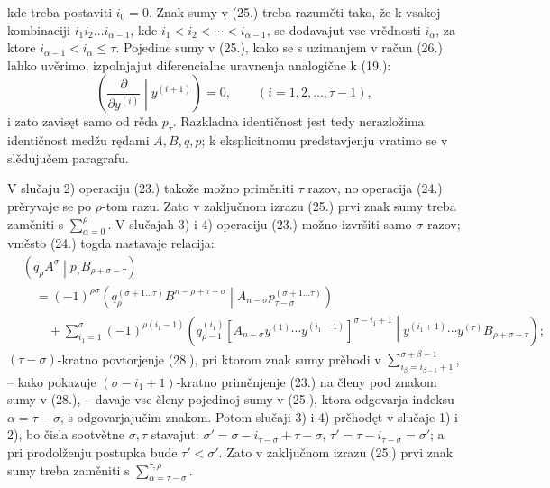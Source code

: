 \documentclass[11pt]{article}
\newcommand{\pair}[2]{\left(#1\middle|#2\right)}
\begin{document}
kde treba postaviti $i_0=0$. Znak sumy v (25.) treba razuměti tako, že k vsakoj kombinaciji $i_1i_2\ldots i_{\alpha-1}$, kde $i_1<i_2<\cdots<i_{\alpha-1}$, se dodavajut vse vrědnosti $i_\alpha$, za ktore $i_{\alpha-1}<i_\alpha\le\tau$. Pojedine sumy v (25.), kako se s uzimanjem v račun (26.) lahko uvěrimo, izpolnjajut diferencialne uravnenja analogične k (19.):
\begin{equation}
 \left(\frac{\partial}{\partial y^{(i)}}\middle|y^{(i+1)}\right)=0,
 \qquad (i=1,2,\ldots,\tau-1),
\tag{27}
\end{equation}
i zato zavisęt samo od rěda $p_\tau$. Razkladna identičnost jest tedy nerazložima identičnost medžu rędami $A,B,q,p$; k eksplicitnomu predstavjenju vratimo se v slědujučem paragrafu.

V slučaju 2) operaciju (23.) takože možno priměniti $\tau$ razov, no operacija (24.) prěryvaje se po $\rho$-tom razu. Zato v zaključnom izrazu (25.) prvi znak sumy treba zaměniti s $\sum_{\alpha=0}^{\rho}$. V slučajah 3) i 4) operaciju (23.) možno izvršiti samo $\sigma$ razov; vměsto (24.) togda nastavaje relacija:
\begin{equation}
\begin{aligned}
&\pair{q_\rho A^\sigma}{p_\tau B_{\rho+\sigma-\tau}}\\
&\quad=(-1)^{\rho\sigma}
\pair{q_\rho^{(\sigma+1\ldots\tau)}B^{n-\rho+\tau-\sigma}}
{A_{n-\sigma}p_{\tau-\sigma}^{(\sigma+1\ldots\tau)}}\\
&\qquad+\sum_{i_1=1}^{\sigma}(-1)^{\rho(i_1-1)}
\pair{q_{\rho-1}^{(i_1)}
[A_{n-\sigma}y^{(1)}\cdots y^{(i_1-1)}]^{\sigma-i_1+1}}
{y^{(i_1+1)}\cdots y^{(\tau)}B_{\rho+\sigma-\tau}};
\end{aligned}
\tag{28}
\end{equation}
$(\tau-\sigma)$-kratno povtorjenje (28.), pri ktorom znak sumy prěhodi v $\sum_{i_\beta=i_{\beta-1}+1}^{\sigma+\beta-1}$, -- kako pokazuje $(\sigma-i_1+1)$-kratno priměnjenje (23.) na členy pod znakom sumy v (28.), -- davaje vse členy pojedinoj sumy v (25.), ktora odgovarja indeksu $\alpha=\tau-\sigma$, s odgovarjajučim znakom. Potom slučaji 3) i 4) prěhodęt v slučaje 1) i 2), bo čisla sootvětne $\sigma,\tau$ stavajut: $\sigma'=\sigma-i_{\tau-\sigma}+\tau-\sigma$, $\tau'=\tau-i_{\tau-\sigma}=\sigma'$; a pri prodolženju postupka bude $\tau'<\sigma'$. Zato v zaključnom izrazu (25.) prvi znak sumy treba zaměniti s $\sum_{\alpha=\tau-\sigma}^{\tau,\rho}$.
\end{document}
